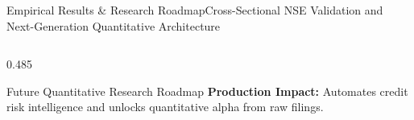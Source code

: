 \begin{frame}{Empirical Results \& Research Roadmap}{Cross-Sectional NSE Validation and Next-Generation Quantitative Architecture}
\begin{columns}[T,onlytextwidth]
\begin{column}{0.485\textwidth}
\begin{quantcard}[height=5.60cm]{Future Quantitative Research Roadmap}
                \vspace{2pt}
                \textbf{\color{deepemerald}Production Impact:}
                Automates credit risk intelligence and unlocks quantitative alpha from raw filings.
                \vspace{3pt}
            \end{quantcard}
        \end{column}
    \end{columns}
\end{frame}
